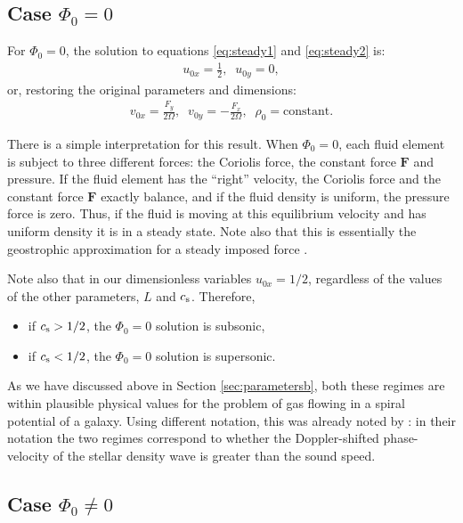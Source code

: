 \documentclass[useAMS,usenatbib]{mn2e}
\begin{document}
\subsection{Case $\Phi_0=0$} \label{sec:trivial}

For $\Phi_0=0$, the solution to equations \eqref{eq:steady1} and \eqref{eq:steady2} is:
%
\begin{align}
u_{0x} =\frac{1}{2},\;\; u_{0y} = 0,
\end{align}
%
or, restoring the original parameters and dimensions:
\begin{align}
v_{0x} = \frac{F_y}{2 \Omega},\;\; v_{0y} = - \frac{F_x}{2 \Omega},\;\;  \rho_0 = \text{constant}. \label{eq:td}
\end{align}

There is a simple interpretation for this result. When $\Phi_0=0$, each fluid element is subject to three different forces: the Coriolis force, the constant force $\mathbf{F}$ and pressure. If the fluid element has the ``right'' velocity, the Coriolis force and the constant force $\mathbf{F}$ exactly balance, and if the fluid density is uniform, the pressure force is zero. Thus, if the fluid is moving at this equilibrium velocity and has uniform density it is in a steady state. Note also that this is essentially the geostrophic approximation for a steady imposed force \citep[e.g.][]{Pedlosky1982}.

Note also that in our dimensionless variables $u_{0x}=1/2$, regardless of the values of the other parameters, $L$ and $c_{\rm s}$. Therefore, 
\begin{itemize}
\item if $c_{\rm s}>1/2$, the $\Phi_0=0$ solution is subsonic,
\item if $c_{\rm s}<1/2$, the $\Phi_0=0$ solution is supersonic.
\end{itemize}

As we have discussed above in Section \ref{sec:parametersb}, both these regimes are within plausible physical values for the problem of gas flowing in a spiral potential of a galaxy. Using different notation, this was already noted by \cite{Shu+1973}: in their notation the two regimes correspond to whether the Doppler-shifted phase-velocity of the stellar density wave is greater than the sound speed.

\subsection{Case $\Phi_0\neq0$}
\end{document}

